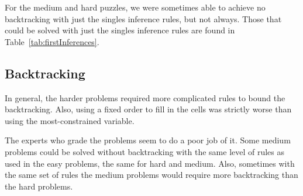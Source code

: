 \documentclass{article}
\begin{document}
For the medium and hard puzzles, we were sometimes able to achieve no backtracking with just the singles inference rules, but not always. Those that could be solved with just the singles inference rules are found in Table~\ref{tab:firstInferences}.
\subsection{Backtracking}
In general, the harder problems required more complicated rules to bound the backtracking. Also, using a fixed order to fill in the cells was strictly worse than using the most-constrained variable.

The experts who grade the problems seem to do a poor job of it. Some medium problems could be solved without backtracking with the same level of rules as used in the easy problems, the same for hard and medium. Also, sometimes with the same set of rules the medium problems would require more backtracking than the hard problems.
\end{document}
